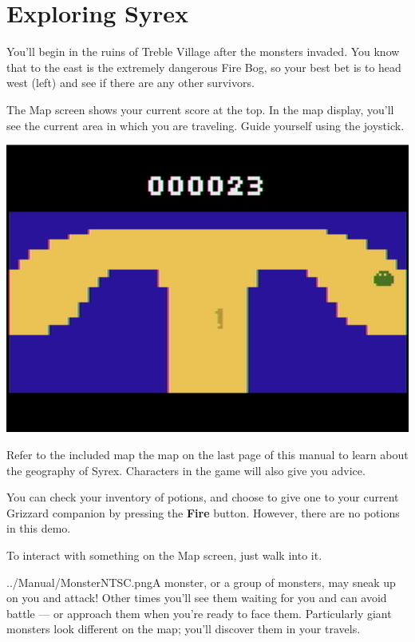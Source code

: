 \documentclass[9pt,twocolumn,openany,article]{memoir}
\newcommand\englishskip{\vspace{14pt}}
\begin{document}
\fi

\section{Exploring Syrex}

You'll begin in the ruins of  Treble Village after the monsters invaded.
You know that to  the east is the extremely dangerous  Fire Bog, so your
best  bet   is  to  head   west  (left)  and   see  if  there   are  any
other survivors.

The Map screen shows your current score  at the top. In the map display,
you'll see the  current area in which you are  traveling. Guide yourself
using the joystick.

\begin{center}
  \includegraphics[width=.75\columnwidth]{../Manual/MapNTSC.png}
\end{center}

Refer to \ifdefined\ATARIAGESAVE  the included map \else the  map on the
last page  of this  manual \fi  to learn about  the geography  of Syrex.
Characters in the game will also give you advice.

You can check your inventory of potions,  and choose to give one to your
current  Grizzard  companion  by   pressing  the  \textbf{Fire}  button.
\ifdefined\DEMO However, there are no potions in this demo. \fi

To interact with something on the Map screen, just walk into it.

\englishskip

\lettrine[image=true,                lines=4,               findent=3pt,
nindent=3pt]{../Manual/MonsterNTSC.png}{}\noindent{}A     monster,    or
a group of monsters, may sneak up  on you and attack! Other times you'll
see them waiting for you and can  avoid battle --- or approach them when
you're ready to face them. Particularly giant monsters look different on
the map; you'll discover them in your travels.
\end{document}
